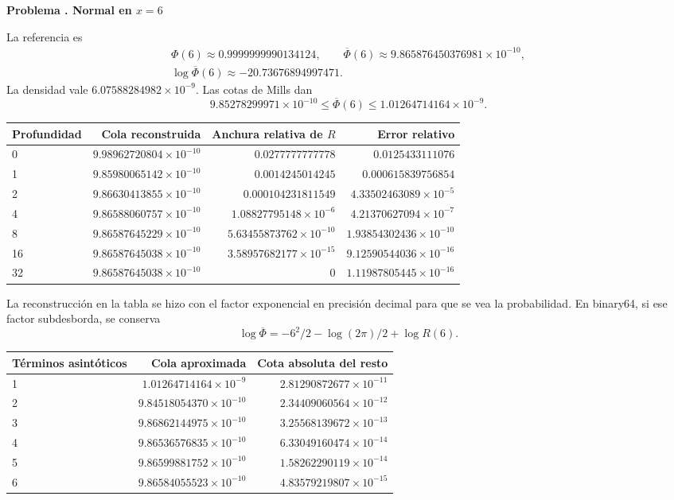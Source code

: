 \documentclass[11pt,a4paper]{article}
\theoremstyle{definition}
\newcommand{\Q}{\overline\Phi}
\newcounter{problema}
\newenvironment{resuelto}[1]{\refstepcounter{problema}\par\medskip\Needspace{6\baselineskip}\textbf{Problema \theproblema. #1}\par}{\par\medskip}
\begin{document}
\begin{resuelto}{Normal en $x=6$}
La referencia es
\[
\begin{gathered}
\Phi(6)\approx0.9999999990134124,\qquad \Q(6)\approx9.865876450376981\times10^{-10},\\
\log\Q(6)\approx-20.73676894997471.
\end{gathered}
\]
La densidad vale $6.07588284982\times10^{-9}$. Las cotas de Mills dan
\[
9.85278299971\times10^{-10}\le\Q(6)\le1.01264714164\times10^{-9}.
\]

\begin{center}\small\begin{tabular}{lrrr}
\toprule
Profundidad & Cola reconstruida & Anchura relativa de $R$ & Error relativo\\\midrule
0 & $9.98962720804\times10^{-10}$ & $0.0277777777778$ & $0.0125433111076$\\
1 & $9.85980065142\times10^{-10}$ & $0.0014245014245$ & $0.000615839756854$\\
2 & $9.86630413855\times10^{-10}$ & $0.000104231811549$ & $4.33502463089\times10^{-5}$\\
4 & $9.86588060757\times10^{-10}$ & $1.08827795148\times10^{-6}$ & $4.21370627094\times10^{-7}$\\
8 & $9.86587645229\times10^{-10}$ & $5.63455873762\times10^{-10}$ & $1.93854302436\times10^{-10}$\\
16 & $9.86587645038\times10^{-10}$ & $3.58957682177\times10^{-15}$ & $9.12590544036\times10^{-16}$\\
32 & $9.86587645038\times10^{-10}$ & $0$ & $1.11987805445\times10^{-16}$\\
\bottomrule\end{tabular}\end{center}

La reconstrucción en la tabla se hizo con el factor exponencial en precisión decimal para que se vea la probabilidad. En binary64, si ese factor subdesborda, se conserva
\[
\log\Q=-6^2/2-\log(2\pi)/2+\log R(6).
\]

\begin{center}\small\begin{tabular}{lrr}
\toprule
Términos asintóticos & Cola aproximada & Cota absoluta del resto\\\midrule
1 & $1.01264714164\times10^{-9}$ & $2.81290872677\times10^{-11}$\\
2 & $9.84518054370\times10^{-10}$ & $2.34409060564\times10^{-12}$\\
3 & $9.86862144975\times10^{-10}$ & $3.25568139672\times10^{-13}$\\
4 & $9.86536576835\times10^{-10}$ & $6.33049160474\times10^{-14}$\\
5 & $9.86599881752\times10^{-10}$ & $1.58262290119\times10^{-14}$\\
6 & $9.86584055523\times10^{-10}$ & $4.83579219807\times10^{-15}$\\
\bottomrule\end{tabular}\end{center}


\end{resuelto}
\end{document}
